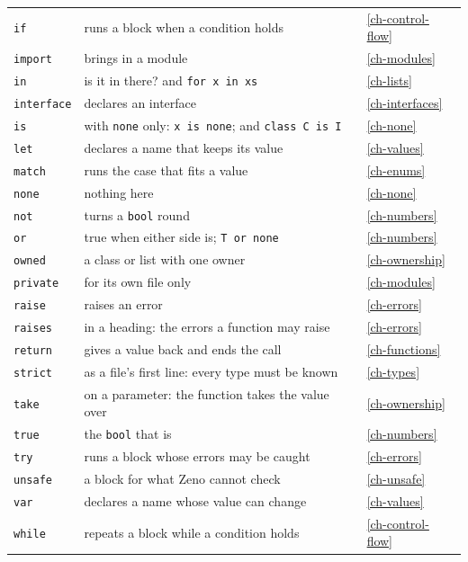 \begin{center}
\begin{longtable}{lP{8.2cm}l}
\verb|if| & runs a block when a condition holds & \hyperref[ch-control-flow]{\ref*{ch-control-flow}} \\
\verb|import| & brings in a module & \hyperref[ch-modules]{\ref*{ch-modules}} \\
\verb|in| & is it in there? and \verb|for x in xs| & \hyperref[ch-lists]{\ref*{ch-lists}} \\
\verb|interface| & declares an interface & \hyperref[ch-interfaces]{\ref*{ch-interfaces}} \\
\verb|is| & with \verb|none| only: \verb|x is none|; and \verb|class C is I| & \hyperref[ch-none]{\ref*{ch-none}} \\
\verb|let| & declares a name that keeps its value & \hyperref[ch-values]{\ref*{ch-values}} \\
\verb|match| & runs the case that fits a value & \hyperref[ch-enums]{\ref*{ch-enums}} \\
\verb|none| & nothing here & \hyperref[ch-none]{\ref*{ch-none}} \\
\verb|not| & turns a \verb|bool| round & \hyperref[ch-numbers]{\ref*{ch-numbers}} \\
\verb|or| & true when either side is; \verb|T or none| & \hyperref[ch-numbers]{\ref*{ch-numbers}} \\
\verb|owned| & a class or list with one owner & \hyperref[ch-ownership]{\ref*{ch-ownership}} \\
\verb|private| & for its own file only & \hyperref[ch-modules]{\ref*{ch-modules}} \\
\verb|raise| & raises an error & \hyperref[ch-errors]{\ref*{ch-errors}} \\
\verb|raises| & in a heading: the errors a function may raise & \hyperref[ch-errors]{\ref*{ch-errors}} \\
\verb|return| & gives a value back and ends the call & \hyperref[ch-functions]{\ref*{ch-functions}} \\
\verb|strict| & as a file's first line: every type must be known & \hyperref[ch-types]{\ref*{ch-types}} \\
\verb|take| & on a parameter: the function takes the value over & \hyperref[ch-ownership]{\ref*{ch-ownership}} \\
\verb|true| & the \verb|bool| that is & \hyperref[ch-numbers]{\ref*{ch-numbers}} \\
\verb|try| & runs a block whose errors may be caught & \hyperref[ch-errors]{\ref*{ch-errors}} \\
\verb|unsafe| & a block for what Zeno cannot check & \hyperref[ch-unsafe]{\ref*{ch-unsafe}} \\
\verb|var| & declares a name whose value can change & \hyperref[ch-values]{\ref*{ch-values}} \\
\verb|while| & repeats a block while a condition holds & \hyperref[ch-control-flow]{\ref*{ch-control-flow}} \\
\bottomrule
\end{longtable}
\end{center}

